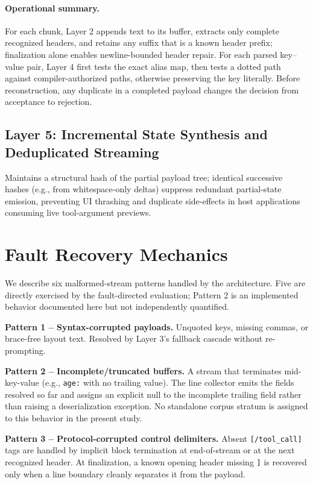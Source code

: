 \documentclass[conference]{IEEEtran}
\begin{document}
\paragraph{Operational summary.} For each chunk, Layer 2 appends text to its
buffer, extracts only complete recognized headers, and retains any suffix that
is a known header prefix; finalization alone enables newline-bounded header
repair. For each parsed key--value pair, Layer 4 first tests the exact alias
map, then tests a dotted path against compiler-authorized paths, otherwise
preserving the key literally. Before reconstruction, any duplicate in a
completed payload changes the decision from acceptance to rejection.

\subsection{Layer 5: Incremental State Synthesis and Deduplicated Streaming}
Maintains a structural hash of the partial payload tree; identical
successive hashes (e.g., from whitespace-only deltas) suppress redundant
partial-state emission, preventing UI thrashing and duplicate
side-effects in host applications consuming live tool-argument previews.

\section{Fault Recovery Mechanics}

We describe six malformed-stream patterns handled by the architecture. Five
are directly exercised by the fault-directed evaluation; Pattern 2 is an
implemented behavior documented here but not independently quantified.

\textbf{Pattern 1 -- Syntax-corrupted payloads.} Unquoted keys, missing
commas, or brace-free layout text. Resolved by Layer 3's fallback cascade
without re-prompting.

\textbf{Pattern 2 -- Incomplete/truncated buffers.} A stream that
terminates mid-key-value (e.g., \texttt{age:} with no trailing value).
The line collector emits the fields resolved so far and assigns an
explicit null to the incomplete trailing field rather than raising a
deserialization exception. No standalone corpus stratum is assigned to this
behavior in the present study.

\textbf{Pattern 3 -- Protocol-corrupted control delimiters.} Absent
\texttt{[/tool\_call]} tags are handled by implicit block termination at
end-of-stream or at the next recognized header. At finalization, a known
opening header missing \texttt{]} is recovered only when a line boundary
cleanly separates it from the payload.
\end{document}
